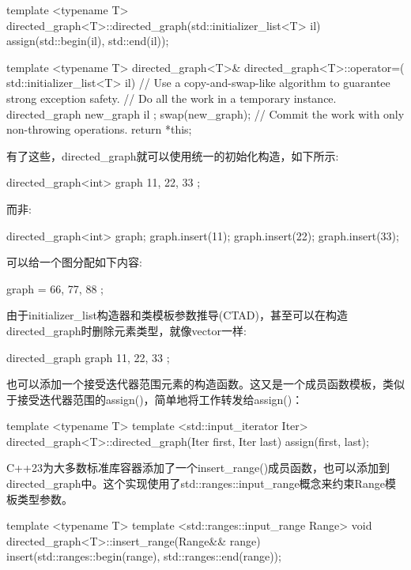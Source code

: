 \begin{cpp}
template <typename T>
directed_graph<T>::directed_graph(std::initializer_list<T> il)
{
    assign(std::begin(il), std::end(il));
}

template <typename T>
directed_graph<T>& directed_graph<T>::operator=(
    std::initializer_list<T> il)
{
    // Use a copy-and-swap-like algorithm to guarantee strong exception safety.
    // Do all the work in a temporary instance.
    directed_graph new_graph { il };
    swap(new_graph); // Commit the work with only non-throwing operations.
    return *this;
}
\end{cpp}

有了这些，directed\_graph就可以使用统一的初始化构造，如下所示:

\begin{cpp}
directed_graph<int> graph { 11, 22, 33 };
\end{cpp}

而非:

\begin{cpp}
directed_graph<int> graph;
graph.insert(11);
graph.insert(22);
graph.insert(33);
\end{cpp}

可以给一个图分配如下内容:

\begin{cpp}
graph = { 66, 77, 88 };
\end{cpp}

由于initializer\_list构造器和类模板参数推导(CTAD)，甚至可以在构造directed\_graph时删除元素类型，就像vector一样:

\begin{cpp}
directed_graph graph { 11, 22, 33 };
\end{cpp}

也可以添加一个接受迭代器范围元素的构造函数。这又是一个成员函数模板，类似于接受迭代器范围的assign()，简单地将工作转发给assign()：

\begin{cpp}
template <typename T>
template <std::input_iterator Iter>
directed_graph<T>::directed_graph(Iter first, Iter last)
{
    assign(first, last);
}
\end{cpp}

C++23为大多数标准库容器添加了一个insert\_range()成员函数，也可以添加到directed\_graph中。这个实现使用了std::ranges::input\_range概念来约束Range模板类型参数。

\begin{cpp}
template <typename T>
template <std::ranges::input_range Range>
void directed_graph<T>::insert_range(Range&& range)
{
    insert(std::ranges::begin(range), std::ranges::end(range));
}
\end{cpp}

